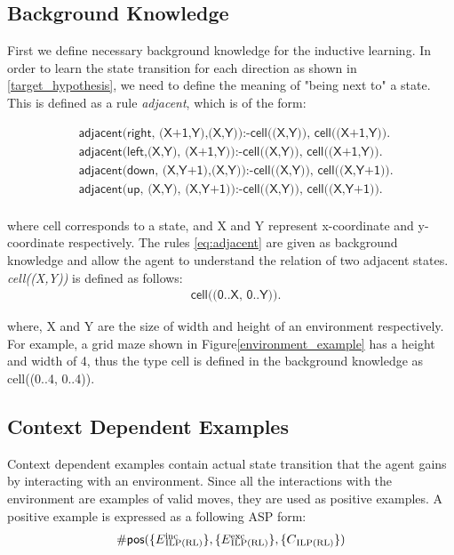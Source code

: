 \subsection{Background Knowledge}
\label{subsec:background_knowledge}
First we define necessary background knowledge for the inductive learning.
In order to learn the state transition for each direction as shown in \ref{target_hypothesis}, we need to define the meaning of "being next to" a state.
This is defined as a rule \textit{adjacent}, which is of the form:

\begin{equation} \label{eq:adjacent}
\begin{split}
&\textsf{adjacent(right, (X+1,Y),(X,Y)):-cell((X,Y)), cell((X+1,Y)).} \\
&\textsf{adjacent(left,(X,Y),  (X+1,Y)):-cell((X,Y)), cell((X+1,Y)).} \\
&\textsf{adjacent(down, (X,Y+1),(X,Y)):-cell((X,Y)), cell((X,Y+1)).} \\
&\textsf{adjacent(up,   (X,Y),  (X,Y+1)):-cell((X,Y)), cell((X,Y+1)).} \\
\end{split}
\end{equation}

where \textsf{cell} corresponds to a state, and \textsf{X} and \textsf{Y} represent x-coordinate and y-coordinate respectively.
The rules \ref{eq:adjacent} are given as background knowledge and allow the agent to understand the relation of two adjacent states.
\textit{cell((X,Y))} is defined as follows:
\begin{equation} \label{eq:cell}
\begin{split}
    &\textsf{cell((0..X, 0..Y)).}
\end{split}
\end{equation}

where, \textsf{X} and \textsf{Y} are the size of width and height of an environment respectively. 
For example, a grid maze shown in Figure\ref{environment_example} has a height and width of 4, thus the type cell is defined in the background knowledge as \textsf{cell((0..4, 0..4))}.

\subsection{Context Dependent Examples}
\label{subsec:context_dependent_examples}
Context dependent examples contain actual state transition that the agent gains by interacting with an environment. Since all the interactions with the environment are examples of valid moves,
they are used as positive examples. A positive example is expressed as a following ASP form:
\begin{equation}
\begin{split}
    \textsf{\#pos}(\{E\SPSB{inc}{ILP(RL)}\}, \{E\SPSB{exc}{ILP(RL)}\}, \{C\textsubscript{ILP(RL)}\})
\end{split}
\end{equation}

